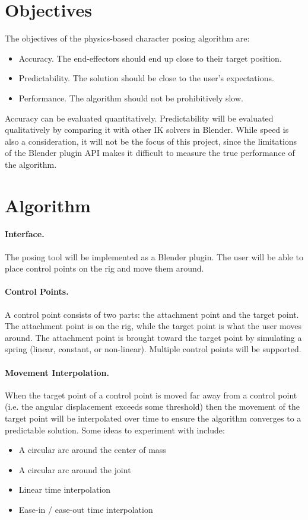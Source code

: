 \documentclass[10pt,twocolumn,letterpaper]{article}
\begin{document}
\section*{Objectives} The objectives of the physics-based character posing algorithm are:
\begin{itemize}
    \item Accuracy. The end-effectors should end up close to their target position.
    \item Predictability. The solution should be close to the user's expectations.  
    \item Performance. The algorithm should not be prohibitively slow.
\end{itemize}

Accuracy can be evaluated quantitatively. Predictability will be evaluated qualitatively by comparing it with other IK solvers in Blender. While speed is also a consideration, it will not be the focus of this project, since the limitations of the Blender plugin API makes it difficult to measure the true performance of the algorithm.

\section*{Algorithm}

\paragraph{Interface.} The posing tool will be implemented as a Blender plugin. The user will be able to place control points on the rig and move them around. 

\paragraph{Control Points.} A control point consists of two parts: the attachment point and the target point. The attachment point is on the rig, while the target point is what the user moves around. The attachment point is brought toward the target point by simulating a spring (linear, constant, or non-linear). Multiple control points will be supported.

\paragraph{Movement Interpolation.} When the target point of a control point is moved far away from a control point (i.e. the angular displacement exceeds some threshold) then the movement of the target point will be interpolated over time to ensure the algorithm converges to a predictable solution. Some ideas to experiment with include:
\begin{itemize}
    \item A circular arc around the center of mass
    \item A circular arc around the joint
    \item Linear time interpolation
    \item Ease-in / ease-out time interpolation
\end{itemize}
\end{document}
